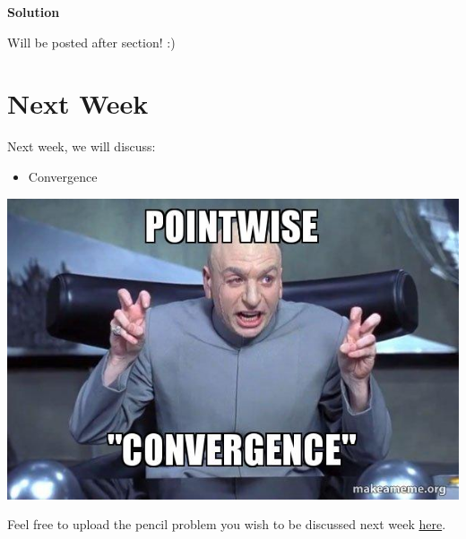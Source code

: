 \documentclass[
  letterpaper,
  DIV=11,
  numbers=noendperiod]{scrreprt}
\providecommand{\tightlist}{%
  \setlength{\itemsep}{0pt}\setlength{\parskip}{0pt}}\usepackage{longtable,booktabs,array}
\theoremstyle{definition}
\theoremstyle{plain}
\theoremstyle{remark}
\begin{document}
\begin{tcolorbox}[enhanced jigsaw, opacityback=0, colback=white, leftrule=.75mm, bottomrule=.15mm, arc=.35mm, rightrule=.15mm, breakable, left=2mm, toprule=.15mm, colframe=quarto-callout-tip-color-frame]
\begin{minipage}[t]{5.5mm}
\textcolor{quarto-callout-tip-color}{\faLightbulb}
\end{minipage}%
\begin{minipage}[t]{\textwidth - 5.5mm}

\textbf{Solution}\vspace{2mm}

Will be posted after section! :)

\end{minipage}%
\end{tcolorbox}

\hypertarget{next-week-7}{%
\section*{Next Week}\label{next-week-7}}


Next week, we will discuss:

\begin{itemize}
\tightlist
\item
  Convergence
\end{itemize}

\includegraphics{./assets/img/convergence.jpeg}

Feel free to upload the pencil problem you wish to be discussed next
week \href{https://forms.gle/RBmMNYJp4u3qD5W79}{here}.
\end{document}
